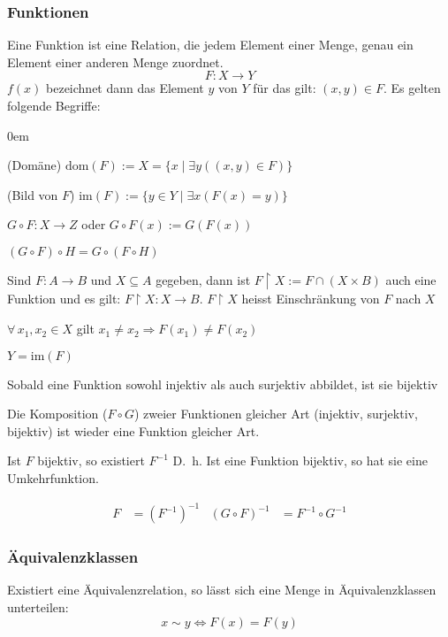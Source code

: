 \subsubsection{Funktionen}
Eine Funktion ist eine Relation, die jedem Element einer Menge, genau ein Element einer anderen Menge zuordnet.
\begin{equation*}
	F: X \rightarrow Y
\end{equation*}
$f(x)$ bezeichnet dann das Element $y$ von $Y$ für das gilt: $(x, y) \in F$.
Es gelten folgende Begriffe:
\begin{description}\itemsep0em
 \item [Definitionsmenge] (Domäne) $\mbox{dom}(F) := X = \{x \mid \exists y ((x, y) \in F)\}$
 \item [Wertebereich ] (Bild von $F$) $\mbox{im}(F) := \{y \in Y \mid \exists x (F(x) = y)\}$
 \item [Erweiterte Funktion] $G \circ F: X \rightarrow Z$ oder $G \circ F(x) := G(F(x))$
 \item [Assoziativität]	$(G \circ F) \circ H = G \circ (F \circ H)$
 \item [Einschränkung] Sind $F: A \rightarrow B$ und $X \subseteq A$ gegeben, dann ist $F \upharpoonright X := F \cap (X \times B)$
auch eine Funktion und es gilt: $F \upharpoonright X : X \rightarrow B$. $F \upharpoonright X$ heisst Einschränkung
von $F$ nach $X$
 \item [Injektivität] $\forall \,x_1, x_2 \in X$ gilt $x_1 \neq x_2 \Rightarrow F(x_1) \neq F(x_2)$ 
 \item [Surjektivität] $Y = \mbox{im}(F)$
 \item [Bijektivität] Sobald eine Funktion sowohl injektiv als auch surjektiv abbildet, ist sie bijektiv 
 \end{description}

\begin{satz}
 Die Komposition ($F \circ G$) zweier Funktionen gleicher Art (injektiv, surjektiv, bijektiv) ist wieder eine Funktion gleicher Art.
\end{satz}
\begin{satz}
 Ist $F$ bijektiv, so existiert $F^{-1}$ D.\, h. Ist eine Funktion bijektiv, so hat sie eine Umkehrfunktion.
\end{satz}
\begin{align*}
 F & = (F^{-1})^{-1} & (G \circ F)^{-1}& = F^{-1} \circ G^{-1}
\end{align*}

\subsubsection{Äquivalenzklassen}
Existiert eine Äquivalenzrelation, so lässt sich eine Menge in Äquivalenzklassen unterteilen: 
\begin{equation*}
 x \sim y \Leftrightarrow F(x) = F(y)
\end{equation*}


